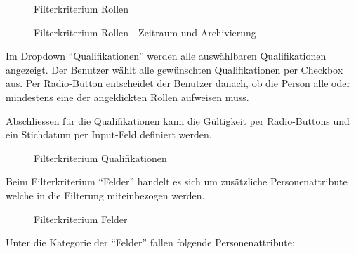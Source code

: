 \begin{figure}[h]
   \centering
   \caption{Filterkriterium Rollen}
\end{figure}

\begin{figure}[h]
   \centering
   \caption{Filterkriterium Rollen - Zeitraum und Archivierung}
\end{figure}

\newpage

Im Dropdown ``Qualifikationen'' werden alle auswählbaren Qualifikationen angezeigt.
Der Benutzer wählt alle gewünschten Qualifikationen per Checkbox aus. Per Radio-Button entscheidet
der Benutzer danach, ob die Person alle oder mindestens eine der angeklickten Rollen aufweisen muss.

Abschliessen für die Qualifikationen kann die Gültigkeit per Radio-Buttons und ein Stichdatum
per Input-Feld definiert werden.

\begin{figure}[h]
   \centering
   \caption{Filterkriterium Qualifikationen}
\end{figure}

Beim Filterkriterium ``Felder'' handelt es sich um zusätzliche Personenattribute welche in
die Filterung miteinbezogen werden.

\begin{figure}[h]
   \centering
   \caption{Filterkriterium Felder}
\end{figure}

\newpage

Unter die Kategorie der ``Felder'' fallen folgende Personenattribute:

